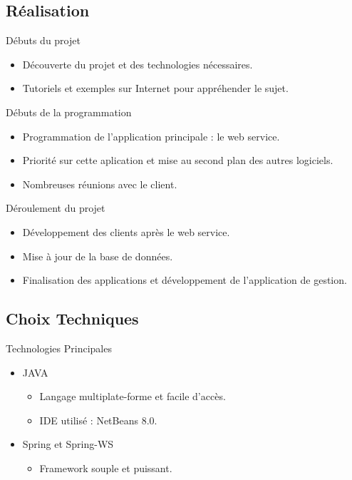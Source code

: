 \documentclass{beamer}
\begin{document}
\subsection{Réalisation}

\begin{frame}{Débuts du projet}
\begin{itemize}
  \item
    Découverte du projet et des technologies nécessaires.
  \item
    Tutoriels et exemples sur Internet pour appréhender le sujet.
\end{itemize}
\end{frame}

\begin{frame}{Débuts de la programmation}
\begin{itemize}
  \item
    Programmation de l'application principale : le web service.
  \item
   Priorité sur cette aplication et mise au second plan des autres logiciels.
  \item
   Nombreuses réunions avec le client.
\end{itemize}
\end{frame}

\begin{frame}{Déroulement du projet}
\begin{itemize}
  \item
    Développement des clients après le web service.
  \item
    Mise à jour de la base de données.
  \item
    Finalisation des applications et développement de l'application de gestion.
\end{itemize}
\end{frame}


\subsection{Choix Techniques}

\begin{frame}{Technologies Principales}
\begin{itemize}
  \item JAVA
     \begin{itemize}
        \item
        	Langage multiplate-forme et facile d'accès.
        \item
	IDE utilisé : NetBeans 8.0.
     \end{itemize}
  \item Spring et Spring-WS
    \begin{itemize}
      \item
       Framework souple et puissant.
    \end{itemize}
\end{itemize}

\end{frame}
\end{document}
